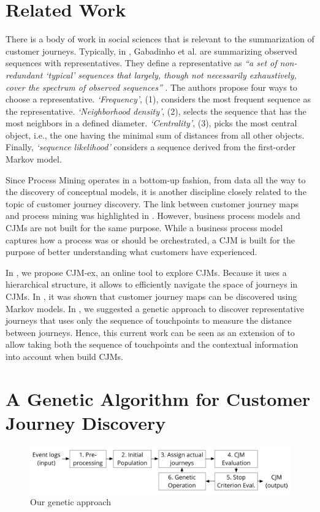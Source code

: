 \documentclass[runningheads]{llncs}
\begin{document}
{\section{Related Work}
There is a body of work in social sciences that is relevant to the summarization of customer journeys. Typically, in \cite{gabadinho2009summarizing,gabadinho2009extracting}, Gabadinho et al. are summarizing observed sequences with representatives. They define a representative as {\it``a set of non-redundant `typical' sequences that largely, though not necessarily exhaustively, cover the spectrum of observed sequences''} \cite{gabadinho2009summarizing}. The authors propose four ways to choose a representative. {\it `Frequency'}, (1), considers the most frequent sequence as the representative. {\it `Neighborhood density'}, (2), selects the sequence that has the most neighbors in a defined diameter. {\it `Centrality'}, (3), picks the most central object, i.e., the one having the minimal sum of distances from all other objects. Finally, {\it `sequence likelihood'} considers a sequence derived from the first-order Markov model. 

Since Process Mining operates in a bottom-up fashion, from data all the way to the discovery of conceptual models, it is another discipline closely related to the topic of customer journey discovery. The link between customer journey maps and process mining was highlighted in \cite{bernard2017cjm}. However, business process models and CJMs are not built for the same purpose. While a business process model captures how a process was or should be orchestrated, a CJM is built for the purpose of better understanding what customers have experienced. 

In \cite{bernard2017cjmEX}, we propose CJM-ex, an online tool to explore CJMs. Because it uses a hierarchical structure, it allows to efficiently navigate the space of journeys in CJMs. In \cite{bernard2017Markov}, it was shown that customer journey maps can be discovered using Markov models. In \cite{bernard2019genetic}, we suggested a genetic approach to discover representative journeys that uses only the sequence of touchpoints to measure the distance between journeys. Hence, this current work can be seen as an extension of \cite{bernard2019genetic} to allow taking both the sequence of touchpoints and the contextual information into account when build CJMs. 


\section{A Genetic Algorithm for Customer Journey Discovery}
\begin{figure}[H]
\centering
\includegraphics[width=0.95\columnwidth]{05_schema/process.pdf}
  \caption{Our genetic approach}
  \label{fig:process}
\end{figure}

}
\end{document}
